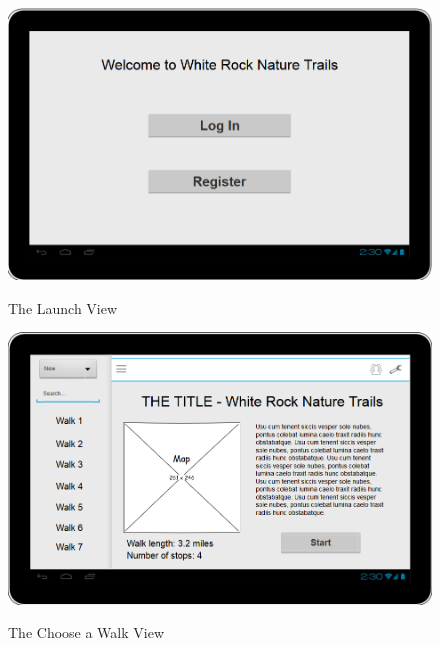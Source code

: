 \documentclass[11pt,a4paper]{article}
\begin{document}
\begin{figure}[H]
\begin{center}
\includegraphics[scale=0.5]{LaunchView.png}
\label{fig:launchView}
\caption{The Launch View}
\end{center}
\end{figure}

\begin{figure}[H]
\begin{center}
\includegraphics[scale=0.5]{ChooseAWalk.png}
\label{fig:chooseWalkView}
\caption{The Choose a Walk View}
\end{center}
\end{figure}
\end{document}
